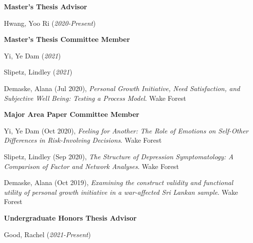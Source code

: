{\large\textbf{Master's Thesis Advisor}}
\begin{etaremune}%
\item Hwang, Yoo Ri (\textit{2020-Present})
\end{etaremune}%

{\large\textbf{Master's Thesis Committee Member}}
\begin{etaremune}%
\item Yi, Ye Dam (\textit{2021})
\item  Slipetz, Lindley (\textit{2021})
\item Demaske, Alana (Jul 2020), \textit{Personal Growth Initiative, Need Satisfaction, and Subjective Well Being: Testing a Process Model}. Wake Forest%
\end{etaremune}%
%
{\large\textbf{Major Area Paper Committee Member}}
\begin{etaremune}%
\item Yi, Ye Dam (Oct 2020), \textit{Feeling for Another: The Role of Emotions on Self-Other Differences in Risk-Involving Decisions}. Wake Forest%
\item Slipetz, Lindley (Sep 2020), \textit{The Structure of Depression Symptomatology: A Comparison of Factor and Network Analyses}. Wake Forest%
\item Demaske, Alana (Oct 2019), \textit{Examining the construct validity and functional utility of personal growth initiative in a war-affected Sri Lankan sample}. Wake Forest%
\end{etaremune}%
%
{\large\textbf{Undergraduate Honors Thesis Advisor}}
\begin{etaremune}%
\item Good, Rachel (\textit{2021-Present})
\end{etaremune}%

